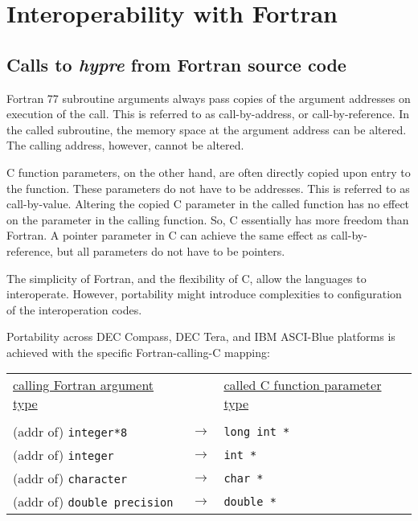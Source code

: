 \chapter{Interoperability with Fortran}

\section{Calls to {\slshape hypre} from Fortran source code}

Fortran 77 subroutine arguments always pass copies of the argument addresses
on execution of the call.  This is referred to as call-by-address, or
call-by-reference.  In the called subroutine, the memory space at the
argument address can be altered.  The calling address, however, cannot be
altered.

C function parameters, on the other hand, are often directly copied upon
entry to the function.  These parameters do not have to be addresses.
This is referred to as call-by-value.  Altering the copied C parameter in the
called function has no effect on the parameter in the calling function.  So,
C essentially has more freedom than Fortran.  A pointer parameter in C can
achieve the same effect as call-by-reference, but all parameters do not have
to be pointers.

The simplicity of Fortran, and the flexibility of C, allow the languages to
interoperate.  However, portability might introduce complexities to
configuration of the interoperation codes.

Portability across DEC Compass, DEC Tera, and IBM ASCI-Blue platforms is
achieved with the specific Fortran-calling-C mapping: 

\vspace{0.2in}

\begin{tabular}{lcl}

\underline{calling Fortran argument type} & &
\underline{called C function parameter type} \\
                              &                   &   \\
\hspace{0.1in} (addr of) \verb+integer*8+        & $\longrightarrow$ &
\hspace{0.5in} \verb+long int *+ \\
\hspace{0.1in} (addr of) \verb+integer+          & $\longrightarrow$ &
\hspace{0.5in} \verb+int *+ \\
\hspace{0.1in} (addr of) \verb+character+        & $\longrightarrow$ &
\hspace{0.5in} \verb+char *+ \\
\hspace{0.1in} (addr of) \verb+double precision+ & $\longrightarrow$ &
\hspace{0.5in} \verb+double *+ \\

\end{tabular}

